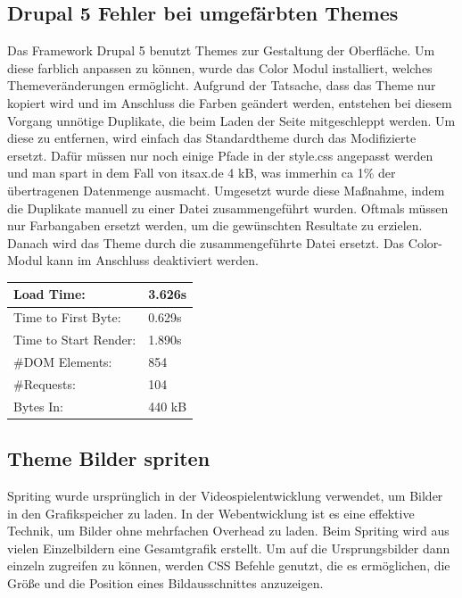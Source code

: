 
\subsection{Drupal 5 Fehler bei umgefärbten Themes}
Das Framework Drupal 5 benutzt Themes zur Gestaltung der Oberfläche. Um diese farblich anpassen zu können, wurde das Color Modul installiert, welches Themeveränderungen ermöglicht. Aufgrund der Tatsache, dass das Theme nur kopiert wird und im Anschluss die Farben geändert werden, entstehen bei diesem Vorgang unnötige Duplikate, die beim Laden der Seite mitgeschleppt werden. Um diese zu entfernen, wird einfach das Standardtheme durch das Modifizierte ersetzt. Dafür müssen  nur noch einige Pfade in der style.css angepasst werden und man spart in dem Fall von itsax.de 4 kB, was immerhin ca 1\% der übertragenen Datenmenge ausmacht. Umgesetzt wurde diese Ma\ss{}nahme, indem die Duplikate manuell zu einer Datei zusammengef\"uhrt wurden. Oftmals m\"ussen nur Farbangaben ersetzt werden, um die gew\"unschten Resultate zu erzielen. Danach wird das Theme durch die zusammengef\"uhrte Datei ersetzt. Das Color-Modul kann im Anschluss deaktiviert werden.

\begin{table}
\caption{Ergebnis der Fehlerbereinigung des Theme Moduls}
    \begin{longtable}{ | p{3cm} | p{1.5cm} | }
    \hline
    Load Time: 			& 3.626s 	\\ \hline
    Time to First Byte:		& 0.629s  	\\ \hline
    Time to Start Render:	& 1.890s	\\ \hline
    \#DOM Elements:		& 854 		\\ \hline
    \#Requests:			& 104 		\\ \hline
    Bytes In:			& 440 kB 	\\ \hline
    \hline
    \end{longtable}
\end{table}

\subsection{Theme Bilder spriten}
Spriting wurde ursprünglich in der Videospielentwicklung verwendet, um Bilder in den Grafikspeicher zu laden. In der Webentwicklung ist es eine effektive Technik, um Bilder ohne mehrfachen Overhead zu laden. Beim Spriting wird aus vielen Einzelbildern eine Gesamtgrafik erstellt. Um auf die Ursprungsbilder dann einzeln zugreifen zu können, werden CSS Befehle genutzt, die es ermöglichen, die Größe und die Position eines Bildausschnittes anzuzeigen. 

